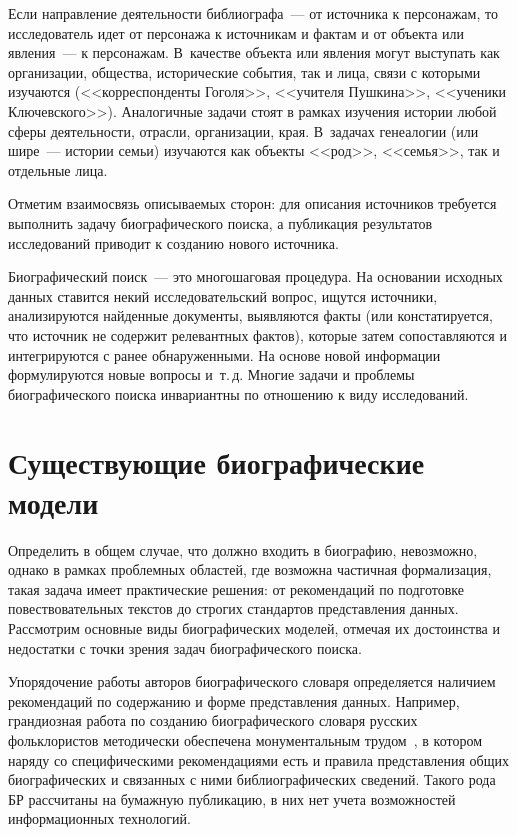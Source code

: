 \begin{multicols}{2}
  Если направление деятельности библиографа~--- от источника к персонажам, то 
исследователь идет от персонажа к источникам и фактам и от объекта или 
явления~--- к персонажам. В~качестве объекта или явления могут выступать 
как организации, общества, исторические события, так и лица, связи с 
которыми изучаются (<<корреспонденты Гоголя>>, <<учителя Пушкина>>, 
<<ученики Ключевского>>). Аналогичные задачи стоят в рамках изучения 
истории любой сферы деятельности, отрасли, организации, края. В~задачах 
генеалогии (или шире~--- истории семьи) изучаются как объекты <<род>>, 
<<семья>>, так и отдельные лица. 
  
  Отметим взаимосвязь описываемых сторон: для описания источников 
требуется выполнить задачу биографического поиска, а публикация 
результатов исследований приводит к созданию нового источника.
  
  Биографический поиск~--- это многошаговая процедура. На основании 
исходных данных ставится некий исследовательский вопрос, ищутся 
источники, анализируются найденные документы, выявляются факты (или 
констатируется, что источник не содержит релевантных фактов), которые затем 
сопоставляются и интегрируются с ранее обнаруженными. На основе новой 
информации формулируются новые вопросы и~т.\,д. Многие задачи и 
проблемы биографического поиска инвариантны по отношению к виду 
исследований.

\section{Существующие биографические модели}

\vspace*{-6pt}
  
  Определить в общем случае, что должно входить в биографию, невозможно, 
однако в рамках проб\-лем\-ных областей, где возможна частичная формализация, 
такая задача имеет практические решения: от рекомендаций по подготовке 
повествовательных текстов до строгих стандартов представления данных. 
Рассмотрим основные виды биографических моделей, отмечая их достоинства 
и недостатки с точки зрения задач биографического поиска.
  
  Упорядочение работы авторов биографического словаря определяется 
наличием рекомендаций по содержанию и форме представления данных. 
Например, грандиозная работа по созданию биографического словаря русских 
фольклористов методически обеспечена монументальным трудом~\cite{5mar}, 
в котором наряду со специфическими рекомендациями есть и правила 
представления общих биографических и связанных с ними библиографических 
сведений. Такого рода БР рассчитаны на бумажную публикацию, в них нет 
учета возможностей информационных технологий.
  

\end{multicols}
